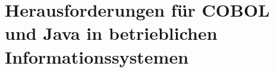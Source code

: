 \chapter{Herausforderungen für COBOL und Java in betrieblichen Informationssystemen}
\label{ch:herausforderungen}
    
    
    
    